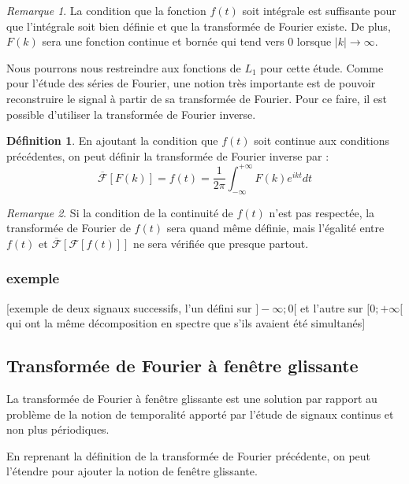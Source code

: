 \documentclass[]{article}
\theoremstyle{remark}
\newtheorem{myrem}{Remarque}
\theoremstyle{definition}
\newtheorem{mydef}{Définition}
\begin{document}
			\begin{myrem}
				La condition que la fonction $f(t)$ soit intégrale est suffisante pour que l'intégrale soit bien définie et que la transformée de Fourier existe. 
				De plus, $F(k)$ sera une fonction continue et bornée qui tend vers 0 lorsque $|k| \longrightarrow \infty$.
			\end{myrem}
			
			Nous pourrons nous restreindre aux fonctions de $L_1$ pour cette étude. 
			Comme pour l'étude des séries de Fourier, une notion très importante est de pouvoir reconstruire le signal à partir de sa transformée de Fourier. Pour ce faire, il est possible d'utiliser la transformée de Fourier inverse. 
		
			\begin{mydef}
				En ajoutant la condition que $f(t)$ soit continue aux conditions précédentes, on peut définir la transformée de Fourier inverse par :
				$$ \overline{\mathcal{F}}[F(k)] = f(t)=\frac{1}{{2\pi}} \int_{-\infty}^{+\infty}F(k)e^{ikt}dt $$ 
				
			\end{mydef}
			
			\begin{myrem}
				Si la condition de la continuité de $f(t)$ n'est pas respectée, la transformée de Fourier de $f(t)$ sera quand même définie, mais l'égalité entre $f(t)$ et $\overline{\mathcal{F}}[\mathcal{F}[f(t)]]$ ne sera vérifiée que presque partout. 
			\end{myrem}
		
			
	\subsubsection{exemple}
	[exemple de deux signaux successifs, l'un défini sur $ ] -\infty; 0[$ et l'autre sur $ [0; +\infty[$ qui ont la même décomposition en spectre que s'ils avaient été simultanés]
	
	\subsection{Transformée de Fourier à fenêtre glissante}
	La transformée de Fourier à fenêtre glissante est une solution par rapport au problème de la notion de temporalité apporté par l'étude de signaux continus et non plus périodiques. 

	En reprenant la définition de la transformée de Fourier précédente, on peut l'étendre pour ajouter la notion de fenêtre glissante. 
		
\end{document}
